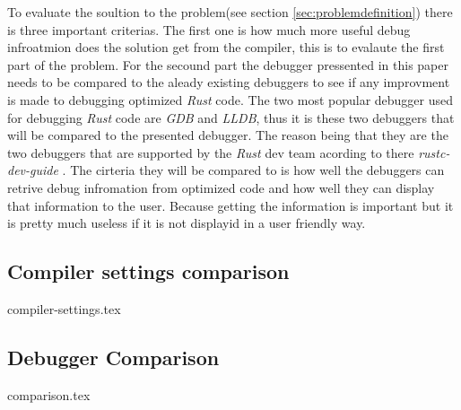 

To evaluate the soultion to the problem(see section \ref{sec:problemdefinition}) there is three important criterias.
The first one is how much more useful debug infroatmion does the solution get from the compiler, this is to evalaute the first part of the problem. 
For the secound part the debugger pressented in this paper needs to be compared to the aleady existing debuggers to see if any improvment is made to debugging optimized \emph{Rust} code.
The two most popular debugger used for debugging \emph{Rust} code are \emph{GDB} and \emph{LLDB}, thus it is these two debuggers that will be compared to the presented debugger.
The reason being that they are the two debuggers that are supported by the \emph{Rust} dev team acording to there \emph{rustc-dev-guide} \cite{rust-dev-guide}.
The cirteria they will be compared to is how well the debuggers can retrive debug infromation from optimized code and how well they can display that information to the user.
Because getting the information is important but it is pretty much useless if it is not displayid in a user friendly way.


\subsection{Compiler settings comparison}
\label{sec:settingscomparison}
{compiler-settings.tex}


\subsection{Debugger Comparison}
\label{sec:debuggercomparison}
{comparison.tex}

